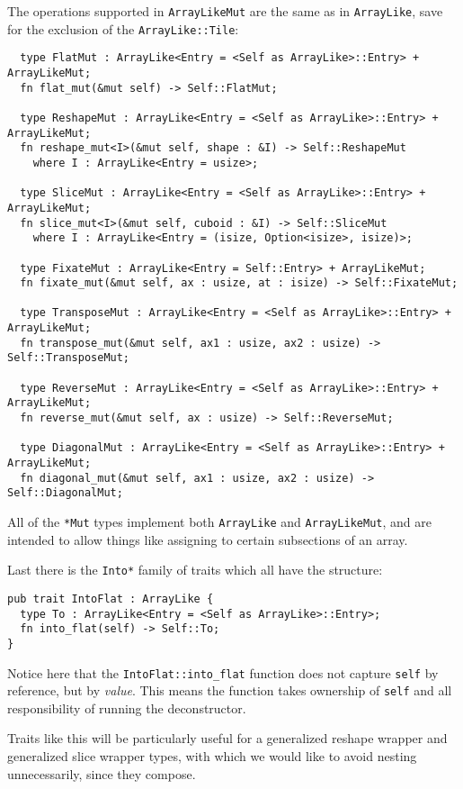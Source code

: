 \documentclass{DIKU-report-variant}
\begin{document}
The operations supported in \texttt{ArrayLikeMut} are the same as in \texttt{ArrayLike},
save for the exclusion of the \texttt{ArrayLike::Tile}:
\begin{lstlisting}
  type FlatMut : ArrayLike<Entry = <Self as ArrayLike>::Entry> + ArrayLikeMut;
  fn flat_mut(&mut self) -> Self::FlatMut;

  type ReshapeMut : ArrayLike<Entry = <Self as ArrayLike>::Entry> + ArrayLikeMut;
  fn reshape_mut<I>(&mut self, shape : &I) -> Self::ReshapeMut
    where I : ArrayLike<Entry = usize>;

  type SliceMut : ArrayLike<Entry = <Self as ArrayLike>::Entry> + ArrayLikeMut;
  fn slice_mut<I>(&mut self, cuboid : &I) -> Self::SliceMut
    where I : ArrayLike<Entry = (isize, Option<isize>, isize)>;

  type FixateMut : ArrayLike<Entry = Self::Entry> + ArrayLikeMut;
  fn fixate_mut(&mut self, ax : usize, at : isize) -> Self::FixateMut;

  type TransposeMut : ArrayLike<Entry = <Self as ArrayLike>::Entry> + ArrayLikeMut;
  fn transpose_mut(&mut self, ax1 : usize, ax2 : usize) -> Self::TransposeMut;

  type ReverseMut : ArrayLike<Entry = <Self as ArrayLike>::Entry> + ArrayLikeMut;
  fn reverse_mut(&mut self, ax : usize) -> Self::ReverseMut;
  
  type DiagonalMut : ArrayLike<Entry = <Self as ArrayLike>::Entry> + ArrayLikeMut;
  fn diagonal_mut(&mut self, ax1 : usize, ax2 : usize) -> Self::DiagonalMut;
\end{lstlisting}
All of the \texttt{*Mut} types implement both \texttt{ArrayLike} and \texttt{ArrayLikeMut},
and are intended to allow things like assigning to certain subsections of an array.

Last there is the \texttt{Into*} family of traits which all have the structure:
\begin{lstlisting}
pub trait IntoFlat : ArrayLike {
  type To : ArrayLike<Entry = <Self as ArrayLike>::Entry>;
  fn into_flat(self) -> Self::To;
}
\end{lstlisting}
Notice here that the \texttt{IntoFlat::into\_flat} function does not capture \texttt{self} by
reference, but by \textit{value}. This means the function takes ownership of \texttt{self} and
all responsibility of running the deconstructor.

Traits like this will be particularly useful for a generalized reshape wrapper and generalized slice wrapper
types, with which we would like to avoid nesting unnecessarily, since they compose.
\end{document}
